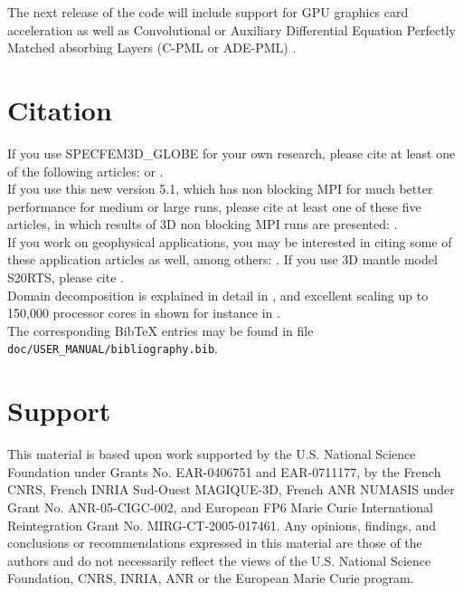 \documentclass[oneside,english]{book}
\begin{document}
The next release of the code will include support for GPU graphics card acceleration \citep{KoMiEr09,KoErGoMi10,MiKo10,Kom11}
as well as Convolutional or Auxiliary Differential Equation Perfectly Matched absorbing Layers (C-PML or ADE-PML) \citep{KoMa07,MaKoEz08,MaKoGe08,MaKo09,MaKoGeBr10}.

\section{Citation}

If you use SPECFEM3D\_GLOBE for your own research, please cite at least one
of the following articles: \cite{TrKoLi08,VaCaSaKoVi99,LeChLiKoHuTr08,LeChKoHuTr09,LeKoHuTr09,KoMiEr09,KoErGoMi10,KoGoErMi10,WiKoScTr04,KoLiTrSuStSh04,ChKoViCaVaFe07,MaKoDi09,KoViCh10,CaKoLaTiMiLeSnTr08,TrKoHjLiZhPeBoMcFrTrHu10,KoRiTr02,KoTr02a,KoTr02b,KoTr99} or \cite{KoVi98}.\\

If you use this new version 5.1, which has non blocking MPI for much better performance for medium or large runs, please cite at least one of these five articles,
in which results of 3D non blocking MPI runs are presented: \cite{KoErGoMi10,KoViCh10,Kom11,PeKoLuMaLeCaLeMaLiBlNiBaTr11,CaKoLaTiMiLeSnTr08}.\\

If you work on geophysical applications, you may be interested in citing some of these application articles as well, among others: \cite{WiKoScTr04,JiTsKoTr05,KrJiKoTr06a,KrJiKoTr06b,LeChLiKoHuTr08,LeChKoHuTr09,LeKoHuTr09,ChFaKo04,FaChKo04,RiRiKoTrHe02,GoAmTaCaSmSaMaKo09,TrKo00,SaKoTr10}.
If you use 3D mantle model S20RTS, please cite \citet{RiVaWo99}.\\

Domain decomposition is explained in detail in \cite{MaKoBlLe08}, and excellent scaling up to 150,000 processor cores in shown for instance in
\cite{CaKoLaTiMiLeSnTr08,KoLaMi08a,MaKoBlLe08,KoErGoMi10,KoGoErMi10,Kom11}.\\

The corresponding Bib\TeX{} entries may be found
in file \texttt{doc/USER\_MANUAL/bibliography.bib}.

\section{Support}

This material is based upon work supported by the U.S. National Science
Foundation under Grants No. EAR-0406751 and EAR-0711177, by the French
CNRS, French INRIA Sud-Ouest MAGIQUE-3D, French ANR NUMASIS under
Grant No. ANR-05-CIGC-002, and European FP6 Marie Curie International
Reintegration Grant No. MIRG-CT-2005-017461.
Any opinions, findings, and conclusions or recommendations expressed in this material are
those of the authors and do not necessarily reflect the views of the
U.S. National Science Foundation, CNRS, INRIA, ANR or the European
Marie Curie program.
\end{document}
